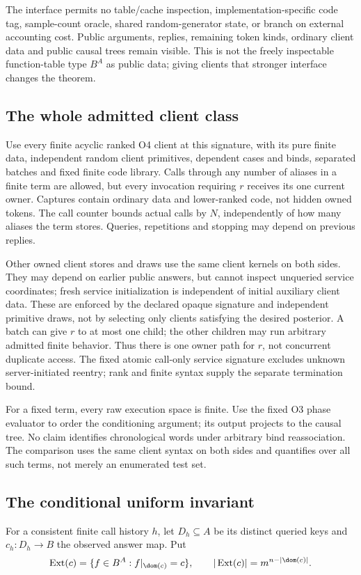 The interface permits no table/cache inspection, implementation-specific
code tag, sample-count oracle, shared random-generator state, or branch
on external accounting cost. Public arguments, replies, remaining token
kinds, ordinary client data and public causal trees remain visible.
This is not the freely inspectable function-table type $B^A$ as public
data; giving clients that stronger interface changes the theorem.

\subsection{The whole admitted client class}
Use every finite acyclic ranked O4 client at this signature, with its
pure finite data, independent random client primitives, dependent cases
and binds, separated batches and fixed finite code library. Calls through
any number of aliases in a finite term are allowed, but every invocation
requiring $r$ receives its one current owner. Captures contain ordinary
data and lower-ranked code, not hidden owned tokens. The call counter
bounds actual calls by $N$, independently of how many aliases the term
stores. Queries, repetitions and stopping may depend on previous replies.

Other owned client stores and draws use the same client kernels on both
sides. They may depend on earlier public answers, but cannot inspect
unqueried service coordinates; fresh service initialization is independent
of initial auxiliary client data. These are enforced by the declared
opaque signature and independent primitive draws, not by selecting only
clients satisfying the desired posterior. A batch can give $r$ to at most
one child; the other children may run arbitrary admitted finite behavior.
Thus there is one owner path for $r$, not concurrent duplicate access.
The fixed atomic call-only service signature excludes unknown
server-initiated reentry; rank and finite syntax supply the separate
termination bound.

For a fixed term, every raw execution space is finite. Use the fixed O3
phase evaluator to order the conditioning argument; its output projects
to the causal tree. No claim identifies chronological words under arbitrary
bind reassociation. The comparison uses the same client syntax on both
sides and quantifies over all such terms, not merely an enumerated test set.

\subsection{The conditional uniform invariant}\label{sec:C-posterior}
For a consistent finite call history $h$, let $D_h\subseteq A$ be its
distinct queried keys and $c_h:D_h\to B$ the observed answer map. Put
\[
\operatorname{Ext}(c)=\{f\in B^A:f|_{\dom(c)}=c\},\qquad
|\operatorname{Ext}(c)|=m^{n-|\dom(c)|}.
\]

